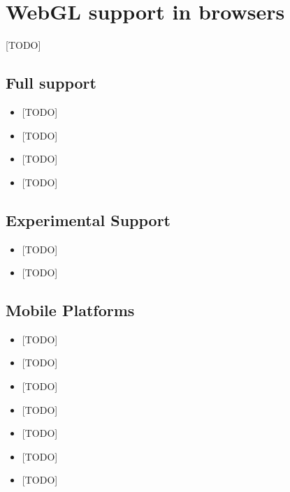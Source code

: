 \documentclass[a4paper,12pt,oneside]{sphinxmanual}
\begin{document}
\index{{[}TODO{]}!{[}TODO{]}}

\section{WebGL support in browsers}
\label{about:index-4}\label{about:id4}\label{about:browser-webgl-support}
{[}TODO{]}


\subsection{Full support}
\label{about:id5}\begin{itemize}
\item {} 
{[}TODO{]}

\item {} 
{[}TODO{]}

\item {} 
{[}TODO{]}

\item {} 
{[}TODO{]}

\end{itemize}


\subsection{Experimental Support}
\label{about:id6}\begin{itemize}
\item {} 
{[}TODO{]}

\item {} 
{[}TODO{]}

\end{itemize}


\subsection{Mobile Platforms}
\label{about:id7}\begin{itemize}
\item {} 
{[}TODO{]}

\item {} 
{[}TODO{]}

\item {} 
{[}TODO{]}

\item {} 
{[}TODO{]}

\item {} 
{[}TODO{]}

\item {} 
{[}TODO{]}

\item {} 
{[}TODO{]}

\end{itemize}
\end{document}
